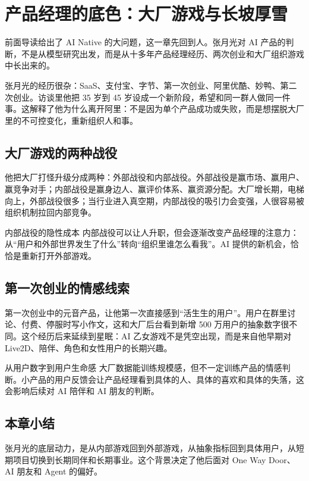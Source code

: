 \section{产品经理的底色：大厂游戏与长坡厚雪}

前面导读给出了 AI Native 的大问题，这一章先回到人。张月光对 AI 产品的判断，不是从模型研究出发，而是从十多年产品经理经历、两次创业和大厂组织游戏中长出来的。

张月光的经历很杂：SaaS、支付宝、字节、第一次创业、阿里优酷、妙鸭、第二次创业。访谈里他把 35 岁到 45 岁设成一个新阶段，希望和同一群人做同一件事。这解释了他为什么离开阿里：不是因为单个产品成功或失败，而是想摆脱大厂里的不可控变化，重新组织人和事。

\subsection{大厂游戏的两种战役}

他把大厂打怪升级分成两种：外部战役和内部战役。外部战役是赢市场、赢用户、赢竞争对手；内部战役是赢身边人、赢评价体系、赢资源分配。大厂增长期，电梯向上，外部战役很多；当行业进入真空期，内部战役的吸引力会变强，人很容易被组织机制拉回内部竞争。

\begin{warningbox}{内部战役的隐性成本}
内部战役可以让人升职，但会逐渐改变产品经理的注意力：从“用户和外部世界发生了什么”转向“组织里谁怎么看我”。AI 提供的新机会，恰恰是重新打开外部游戏。
\end{warningbox}

\subsection{第一次创业的情感线索}

第一次创业中的元音产品，让他第一次直接感到“活生生的用户”。用户在群里讨论、付费、停服时写小作文，这和大厂后台看到新增 500 万用户的抽象数字很不同。这个经历后来延续到星眠：AI 乙女游戏不是凭空出现，而是来自他早期对 Live2D、陪伴、角色和女性用户的长期兴趣。

\begin{knowledgebox}{从用户数字到用户生命感}
大厂数据能训练规模感，但不一定训练产品的情感判断。小产品的用户反馈会让产品经理看到具体的人、具体的喜欢和具体的失落，这会影响后续对 AI 陪伴和 AI 朋友的判断。
\end{knowledgebox}

\subsection{本章小结}

张月光的底层动力，是从内部游戏回到外部游戏，从抽象指标回到具体用户，从短期项目切换到长期同伴和长期事业。这个背景决定了他后面对 One Way Door、AI 朋友和 Agent 的偏好。

